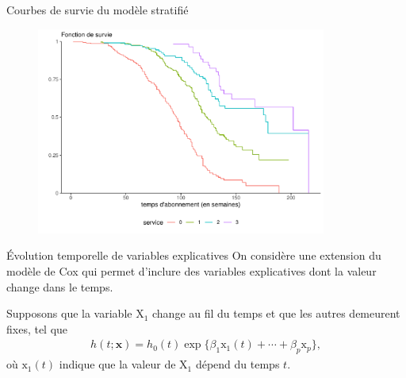 \documentclass[
  ignorenonframetext,
]{beamer}
\begin{document}
\begin{frame}{Courbes de survie du modèle stratifié}
\protect\hypertarget{courbes-de-survie-du-moduxe8le-stratifiuxe9}{}
\begin{figure}

{\centering \includegraphics[width=0.85\textwidth,height=\textheight]{MATH60602-diapos10_files/figure-beamer/unnamed-chunk-6-1.pdf}

}

\end{figure}
\end{frame}

\begin{frame}{Évolution temporelle de variables explicatives}
\protect\hypertarget{uxe9volution-temporelle-de-variables-explicatives}{}
On considère une extension du modèle de Cox qui permet d'inclure des
variables explicatives dont la valeur change dans le temps.

Supposons que la variable \(\mathrm{X}_1\) change au fil du temps et que
les autres demeurent fixes, tel que \begin{align*}
h(t; \boldsymbol{x}) = h_0(t) \exp\{\beta_1\mathrm{x}_1(t) + \cdots + \beta_p\mathrm{x}_p\},
\end{align*} où \(\mathrm{x}_1(t)\) indique que la valeur de
\(\mathrm{X}_1\) dépend du temps \(t\).
\end{frame}
\end{document}
